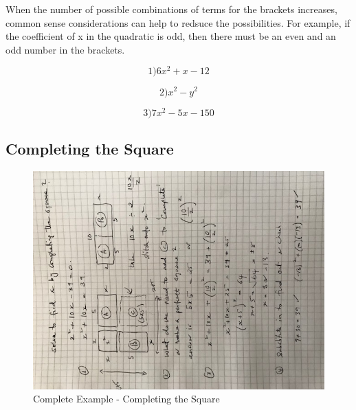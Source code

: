 When the number of possible combinations of terms for the brackets increases, common sense considerations can help to redsuce the possibilities. For example, if the coefficient of x in the quadratic is odd, then there must be an even and an odd number in the brackets.

\begin{equation} 
 1)  6x^{2} +x -12
\end{equation}

\begin{equation} 
 2)  x^{2} -y^{2}
\end{equation}

\begin{equation} 
 3)  7x^{2} -5x - 150
\end{equation}

\subsection{Completing the Square}

\begin{figure}[h]
    \centering
    \includegraphics[width=1.25\textwidth]{IMG_3049}
    \caption{Complete Example - Completing the Square}
    \label{fig:example1}
\end{figure}

